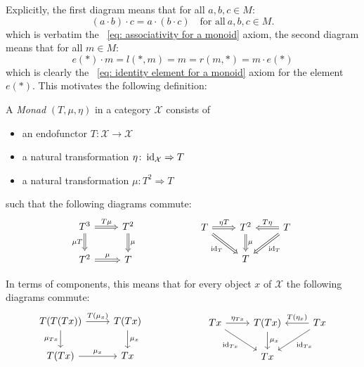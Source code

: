 Explicitly, the first diagram means that for all $a,b,c \in M$:
\[
    (a \cdot b) \cdot c = a \cdot (b \cdot c) 
    \quad \text{for all} \ a,b,c \in M.
\]
which is verbatim the ~\ref{eq: associativity for a monoid} axiom, the second diagram means that for all $m \in M$:
\[
  e(\ast) \cdot m = l(\ast,m) = m = r(m,\ast) = m \cdot e(\ast)  
\]
which is clearly the ~\ref{eq: identity element for a monoid} axiom 
for the element $e(\ast)$.
This motivates the following definition: 
\begin{definition}[Monad]
A \textit{Monad} $(T,\mu, \eta) $ in a category $\mathcal{X}$ consists of
\begin{itemize}
    \item an endofunctor $T\colon \mathcal{X} \to \mathcal{X}$
    \item a natural transformation $\eta \colon \operatorname{id}_\mathcal{X} \Rightarrow T$ 
    \item a natural transformation $\mu\colon T^2 \Rightarrow T $
\end{itemize}  
such that the following diagrams commute: \\
\begin{equation} \label{eq: def monad}
    \begin{tikzcd}
        T^3 \ar[r,"T\mu",Rightarrow] \ar[d,"\mu T"',Rightarrow] 
        & T^2 \ar[d,"\mu",Rightarrow] \\
        T^2 \ar[r,"\mu",Rightarrow]
        & T
    \end{tikzcd}
    \qqq 
    \begin{tikzcd} %
        T \ar[rd,"\id_T"',Rightarrow] \ar[r, "\eta T",Rightarrow] 
        & T^2 \ar[d,"\mu",Rightarrow] 
        & T \ar[l,"T \eta"',Rightarrow] \ar[ld,"\id_T",Rightarrow]\\
        & T
    \end{tikzcd}
\end{equation}

In terms of components, this means that for every object $x$ of $\mathcal{X}$
the following diagrams commute:
\begin{equation} \label{eq: def monad in components}
    \begin{tikzcd}
        T(T(Tx)) \ar[r,"T(\mu_x)"] \ar[d,"\mu_{Tx}"'] 
        & T(Tx) \ar[d,"\mu_x"] \\
        T(Tx) \ar[r,"\mu_x"]
        & Tx
    \end{tikzcd}
    \qqq 
    \begin{tikzcd}
        Tx \ar[rd,"\id_{Tx}"'] \ar[r, "\eta_{Tx}"] 
        & T(Tx) \ar[d,"\mu_x"] 
        & Tx \ar[l,"T(\eta_x)"'] \ar[ld,"\id_{Tx}"]\\
        & Tx
    \end{tikzcd}
\end{equation}
\end{definition}

